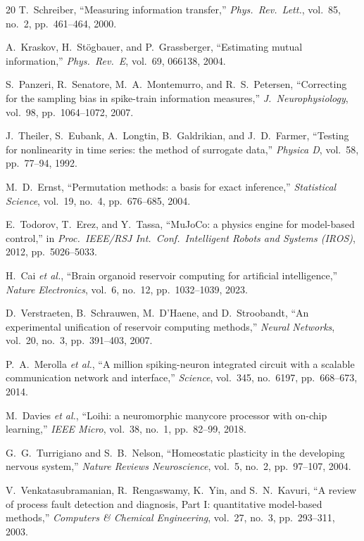 \begin{thebibliography}{20}
T.~Schreiber, ``Measuring information transfer,'' \emph{Phys.\ Rev.\ Lett.},
vol.~85, no.~2, pp.~461--464, 2000.

A.~Kraskov, H.~St{\"o}gbauer, and P.~Grassberger, ``Estimating mutual
information,'' \emph{Phys.\ Rev.\ E}, vol.~69, 066138, 2004.

S.~Panzeri, R.~Senatore, M.~A.~Montemurro, and R.~S.~Petersen, ``Correcting for
the sampling bias in spike-train information measures,'' \emph{J.\
Neurophysiology}, vol.~98, pp.~1064--1072, 2007.

J.~Theiler, S.~Eubank, A.~Longtin, B.~Galdrikian, and J.~D.~Farmer, ``Testing
for nonlinearity in time series: the method of surrogate data,'' \emph{Physica
D}, vol.~58, pp.~77--94, 1992.

M.~D.~Ernst, ``Permutation methods: a basis for exact inference,''
\emph{Statistical Science}, vol.~19, no.~4, pp.~676--685, 2004.

E.~Todorov, T.~Erez, and Y.~Tassa, ``MuJoCo: a physics engine for model-based
control,'' in \emph{Proc.\ IEEE/RSJ Int.\ Conf.\ Intelligent Robots and Systems
(IROS)}, 2012, pp.~5026--5033.

H.~Cai \emph{et al.}, ``Brain organoid reservoir computing for artificial
intelligence,'' \emph{Nature Electronics}, vol.~6, no.~12, pp.~1032--1039,
2023.

D.~Verstraeten, B.~Schrauwen, M.~D'Haene, and D.~Stroobandt, ``An experimental
unification of reservoir computing methods,'' \emph{Neural Networks}, vol.~20,
no.~3, pp.~391--403, 2007.

P.~A.~Merolla \emph{et al.}, ``A million spiking-neuron integrated circuit with
a scalable communication network and interface,'' \emph{Science}, vol.~345,
no.~6197, pp.~668--673, 2014.

M.~Davies \emph{et al.}, ``Loihi: a neuromorphic manycore processor with
on-chip learning,'' \emph{IEEE Micro}, vol.~38, no.~1, pp.~82--99, 2018.

G.~G.~Turrigiano and S.~B.~Nelson, ``Homeostatic plasticity in the developing
nervous system,'' \emph{Nature Reviews Neuroscience}, vol.~5, no.~2,
pp.~97--107, 2004.

V.~Venkatasubramanian, R.~Rengaswamy, K.~Yin, and S.~N.~Kavuri, ``A review of
process fault detection and diagnosis, Part I: quantitative model-based
methods,'' \emph{Computers \& Chemical Engineering}, vol.~27, no.~3,
pp.~293--311, 2003.


\end{thebibliography}
